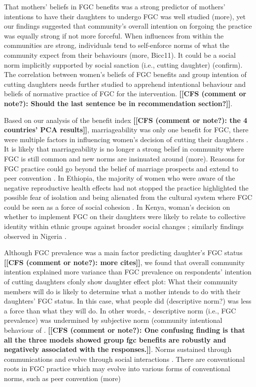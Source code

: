 \documentclass[12pt,]{article}
\newcommand{\comment}[1]{\textbf{[[#1]]}}
\newcommand{\cf}[1]{\comment{CFS (comment or note?): #1}}
\begin{document}
That mothers’ beliefs in FGC benefits was a strong predictor of mothers' intentions to have their daughters to undergo FGC was well studied \cite{PashPonn16} (more), yet our findings suggested that community’s overall intention on forgoing the practice was equally strong if not more forceful.  When influences from within the communities are strong, individuals tend to self-enforce norms of what the community expect from their behaviours \cite{Hayf05, KandNwak09, Mack96, Mack06, MackLeJe08} (more, Bicc11).  It could be a social norm implicitly supported by social sanction (i.e., cutting daughter) \cite{Bicchieri06, MackLeJe08} (confirm).  The correlation between women’s beliefs of FGC benefits and group intention of cutting daughters needs further studied to apprehend intentional behaviour and beliefs of normative practice of FGC for the intervention. \cf{Should the last sentence be in recommendation section?}.

Based on our analysis of the benefit index \cf{the 4 countries’ PCA results}, marriageability was only one benefit for FGC, there were multiple factors in influencing women’s decision of cutting their daughters \cite{MackLeJe08}.  It is likely that marriageability is no longer a strong belief in community where FGC is still common and new norms are insinuated around \cite{EffeVogt15, ShelWand11} (more).  Reasons for FGC practice could go beyond the belief of marriage prospects and extend to peer convention \cite{ShelWand11}.  
In Ethiopia, the majority of women who were aware of the negative reproductive health effects had not stopped the practice highlighted the possible fear of isolation and being alienated from the cultural system where FGC could be seen as a force of social cohesion \cite{YirgKass12}.  In Kenya, woman's decision on whether to implement FGC on their daughters were likely to relate to collective identity within ethnic groups against broader social changes \cite{Achi14, Hayf05}; similarly findings observed in Nigeria \cite{FreyJohn07, KandMwek09}.

Although FGC prevalence was a main factor predicting daughter’s FGC status \cite{BoylSvec19} \cf{more cites}, we found that overall community intention explained more variance than FGC prevalence on respondents’ intention of cutting daughters cfonly{ show daughter effect plot}:  What their community members will do is likely to determine what a mother intends to do with their daughters’ FGC status. In this case, what people did (descriptive norm?) was less a force than what they will do.  In other words, - descriptive norm (i.e., FGC prevalence) was undermined by subjective norm (community intentional behaviour of . \cf{One confusing finding is that all the three models showed group fgc benefits are robustly and negatively associated with the responses.}.  Norms sustained through communications and evolve through social interactions \cite{FishAjze10, RimaLapi15}.   There are conventional roots in FGC practice \cite{FreyJohn07, Hayf05, KandShel19, Mack96, ShelWand11} which may evolve into various forms of conventional norms, such as peer convention \cite{GrosHayd19CONFIRM, ShelWand11} (more)
\end{document}
